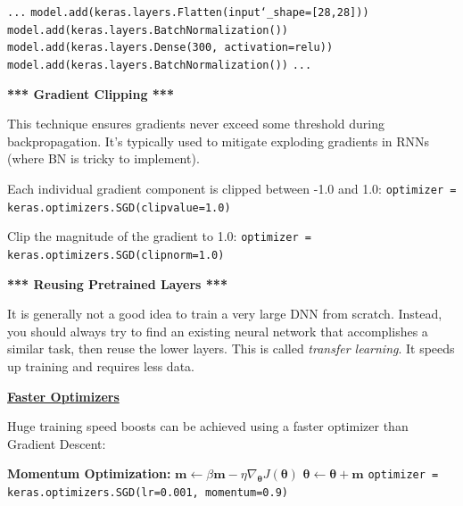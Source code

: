 \texttt{...}\newline
\texttt{model.add(keras.layers.Flatten(input\char`_shape=[28,28]))}\newline
\texttt{model.add(keras.layers.BatchNormalization())}\newline
\texttt{model.add(keras.layers.Dense(300, activation=\textquotesingle relu\textquotesingle))}\newline
\texttt{model.add(keras.layers.BatchNormalization())}\newline
\texttt{...}\newline

\textbf{*** Gradient Clipping ***}

This technique ensures gradients never exceed some threshold during backpropagation.\newline
It's typically used to mitigate exploding gradients in RNNs (where BN is tricky to implement).

Each individual gradient component is clipped between -1.0 and 1.0:\newline
\texttt{optimizer = keras.optimizers.SGD(clipvalue=1.0)}

Clip the magnitude of the gradient to 1.0:\newline
\texttt{optimizer = keras.optimizers.SGD(clipnorm=1.0)}

\newpage

\textbf{*** Reusing Pretrained Layers ***}

It is generally not a good idea to train a very large DNN from scratch.
Instead, you should always try to find an existing neural network that accomplishes a similar task,
then reuse the lower layers. This is called \textit{transfer learning}.
It speeds up training and requires less data.\newline

\textbf{\underline{Faster Optimizers}}

Huge training speed boosts can be achieved using a faster optimizer than Gradient Descent:

\textbf{Momentum Optimization:}\newline
$\boldsymbol{m} \leftarrow \beta \boldsymbol{m} - \eta \nabla_{\boldsymbol{\theta}} J (\boldsymbol{\theta})$\newline
$\boldsymbol{\theta} \leftarrow \boldsymbol{\theta} + \boldsymbol{m}$\newline
\texttt{optimizer = keras.optimizers.SGD(lr=0.001, momentum=0.9)}\newline

